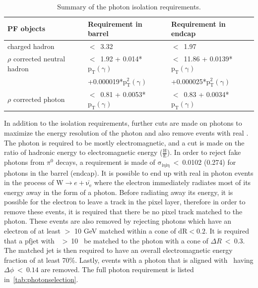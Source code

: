 \begin{table}[htb]
  \begin{center}
    \caption{
      \label{tab:photons}
      Summary of the photon isolation requirements.
    }
    \begin{tabular}{l|l|l}
      \hline
      \hline
      PF objects                      &Requirement in barrel                    &Requirement in endcap \\
      \hline
      charged hadron                  &$<$~3.32                                 &$<$~1.97                                    \\
      $\rho$ corrected neutral hadron &$<$~1.92 + 0.014*$\mathrm{p_{T}(\gamma)}$ &$<$~11.86 + 0.0139*$\mathrm{p_{T}(\gamma)}$ \\
                                      &+0.000019*$\mathrm{p_{T}^{2}(\gamma)}$     &+0.000025*$\mathrm{p_{T}^{2}(\gamma)}$       \\
      $\rho$ corrected photon         &$<$~0.81 + 0.0053*$\mathrm{p_{T}(\gamma)}$&$<$~0.83 + 0.0034*$\mathrm{p_{T}(\gamma)}$  \\
      \hline
      \hline      
    \end{tabular}
  \end{center}
\end{table}

In addition to the isolation requirements, further cuts are made on photons to maximize the energy resolution of the photon and also remove events with real \MET.
The photon is required to be mostly electromagnetic, and a cut is made on the ratio of hadronic energy to electromagnetic energy ($\mathrm{\frac{H}{E}}$).
In order to reject fake photons from $\pi^{0}$ decays, a requirement is made of $\mathrm{\sigma_{i\eta i\eta}~<~}$0.0102 (0.274) for photons in the barrel (endcap).
It is possible to end up with real \MET in photon events in the process of W$\rightarrow e+\mathrm{\bar{\nu_{e}}}$
where the electron immediately radiates most of its energy away in the form of a photon.
Before radiating away its energy, it is possible for the electron to leave a track in the pixel layer,
therefore in order to remove these events, it is required that there be no pixel track matched to the photon.
These events are also removed by rejecting photons which have an electron of at least \pt $>$ 10 GeV matched within a cone of $\mathrm{dR} < 0.2$.
It is required that a pfjet with \pt\ $>~$10 \gev\ be matched to the photon with a cone of $\Delta R~<~0.3$. 
The matched jet is then required to have an overall electromagnetic energy fraction of at least 70\%.
Lastly, events with a photon that is aligned with \MET\ having $\Delta\phi~<~0.14$ are removed. 
The full photon requirement is listed in~\ref{tab:photonselection}.

